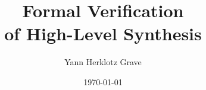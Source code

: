 \documentclass[
  fontsize=12pt,
  twoside=semi,
  bibliography=totoc,
  DIV=11,
  ]{scrbook}
\title{Formal Verification \\ of High-Level Synthesis}
\author{Yann Herklotz Grave}
\date{\DTMsetdatestyle{ymhgshortdate}\today}
\begin{document}












\glsresetall


















\end{document}
